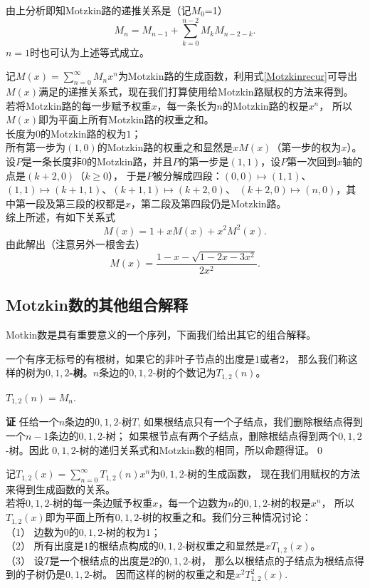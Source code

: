 由上分析即知Motzkin路的递推关系是（记$M_0$=1）
\begin{equation}
\label{Motzkinrecur}
M_n=M_{n-1}+\sum\limits_{k=0}^{n-2}M_kM_{n-2-k}.
\end{equation}
$n=1$时也可认为上述等式成立。

记$M(x)=\sum\limits_{n=0}^\infty M_nx^n$为Motzkin路的生成函数，利用式\eqref{Motzkinrecur}可导出
$M(x)$满足的递推关系式，现在我们打算使用给Motzkin路赋权的方法来得到。\\
\indent 若将Motzkin路的每一步赋予权重$x$，每一条长为$n$的Motzkin路的权是$x^n$，
所以$M(x)$即为平面上所有Motzkin路的权重之和。\\
\indent 长度为$0$的Motzkin路的权为$1$；\\
\indent 所有第一步为$(1,0)$的Motzkin路的权重之和显然是$xM(x)$（第一步的权为$x$）。\\
\indent 设$P$是一条长度非$0$的Motzkin路，并且$P$的第一步是$(1,1)$，设$P$第一次回到$x$轴的点是$(k+2,0)$（$k\geq0$），
于是$P$被分解成四段：$(0,0)\longmapsto(1,1)$、$(1,1)\longmapsto(k+1,1)$、$(k+1,1)\longmapsto(k+2,0)$、
$(k+2,0)\longmapsto(n,0)$，其中第一段及第三段的权都是$x$，第二段及第四段仍是Motzkin路。\\
\indent 综上所述，有如下关系式
\begin{equation}
\label{Motzkinfunc}
M(x)=1+xM(x)+x^2M^2(x).
\end{equation}
由此解出（注意另外一根舍去）
$$M(x)=\frac{1-x-\sqrt{1-2x-3x^2}}{2x^2}.$$
\subsection{Motzkin数的其他组合解释}
Motkin数是具有重要意义的一个序列，下面我们给出其它的组合解释。
\begin{defi}
一个有序无标号的有根树，如果它的非叶子节点的出度是$1$或者$2$，
那么我们称这样的树为{\bf $0,1,2$-树}。$n$条边的$0,1,2$-树的个数记为$T_{1,2}(n)$。
\end{defi}

\begin{prop}
\label{1,2tree}
$T_{1,2}(n)=M_n$.
\end{prop}

{\bf 证} 任给一个$n$条边的$0,1,2$-树$T$,
如果根结点只有一个子结点，我们删除根结点得到一个$n-1$条边的$0,1,2$-树；
如果根节点有两个子结点，删除根结点得到两个$0,1,2$-树。因此
$0,1,2$-树的递归关系式和Motzkin数的相同，所以命题得证。\qed

记$T_{1,2}(x)=\sum\limits_{n=0}^\infty T_{1,2}(n) x^n$为$0,1,2$-树的生成函数，
现在我们用赋权的方法来得到生成函数的关系。\\
\indent 若将$0,1,2$-树的每一条边赋予权重$x$，每一个边数为$n$的$0,1,2$-树的权是$x^n$，
所以$T_{1,2}(x)$即为平面上所有$0,1,2$-树的权重之和。我们分三种情况讨论：\\
（1） 边数为$0$的$0,1,2$-树的权为$1$；\\
（2） 所有出度是$1$的根结点构成的$0,1,2$-树权重之和显然是$xT_{1,2}(x)$。\\
（3） 设$T$是一个根结点的出度是$2$的$0,1,2$-树，
那么以根结点的子结点为根结点得到的子树仍是$0,1,2$-树。
因而这样的树的权重之和是$x^2T_{1,2}^2(x)$.

